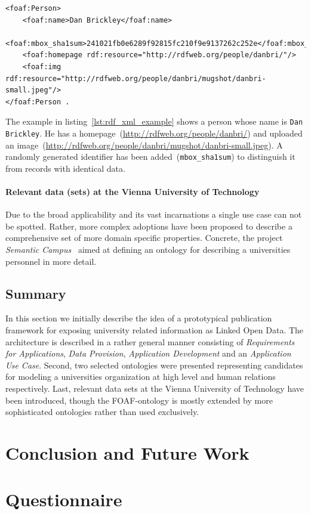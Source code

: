 \documentclass{article}
\begin{document}
\begin{lstlisting}[caption={RDF/XML representation of a person using the FOAF vocabulary},label={lst:rdf_xml_example}]
<foaf:Person>
	<foaf:name>Dan Brickley</foaf:name>
	<foaf:mbox_sha1sum>241021fb0e6289f92815fc210f9e9137262c252e</foaf:mbox_sha1sum>
	<foaf:homepage rdf:resource="http://rdfweb.org/people/danbri/"/>
	<foaf:img rdf:resource="http://rdfweb.org/people/danbri/mugshot/danbri-small.jpeg"/>
</foaf:Person .
\end{lstlisting}

The example in listing~\ref{lst:rdf_xml_example} shows a person whose name is \texttt{Dan Brickley}. He has a homepage~(\url{http://rdfweb.org/people/danbri/}) and uploaded an image~(\url{http://rdfweb.org/people/danbri/mugshot/danbri-small.jpeg}). A randomly generated identifier has been added~(\texttt{mbox\_sha1sum}) to distinguish it from records with identical data. 

\paragraph{Relevant data (sets) at the Vienna University of Technology}
Due to the broad applicability and its vast incarnations a single use case can not be spotted. Rather, more complex adoptions have been proposed to describe a comprehensive set of more domain specific properties. Concrete, the project \textit{Semantic Campus}~\cite{inproceedings:semantic-campus} aimed at defining an ontology for describing a universities personnel in more detail. 
\subsection{Summary}
In this section we initially describe the idea of a prototypical publication framework for exposing university related information as Linked Open Data. The architecture is described in a rather general manner consisting of \textit{Requirements for Applications}, \textit{Data Provision}, \textit{Application Development} and an \textit{Application Use Case}. Second, two selected ontologies were presented representing candidates for modeling a universities organization at high level and human relations respectively.
Last, relevant data sets at the Vienna University of Technology have been introduced, though the FOAF-ontology is mostly extended by more sophisticated ontologies rather than used exclusively. 
\section{Conclusion and Future Work}

\newpage
{}



\newpage
\appendix

\section{Questionnaire}

\end{document}

